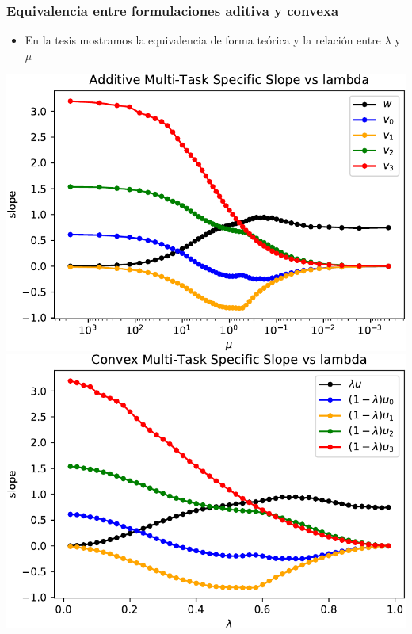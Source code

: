 \documentclass[aspectratio=43,spanish]{beamer}
\begin{document}
\begin{frame}
      \frametitle{Equivalencia entre formulaciones aditiva y convexa}

      \begin{itemize}
            \item En la tesis mostramos la equivalencia de forma teórica y la relación entre $\lambda$ y $\mu$
      \end{itemize}
      \vfill

    \includegraphics[width=.5\textwidth]{Chapter6/HAIS2019/synthetic_specWeights_add-crop.pdf}%
    \includegraphics[width=.5\textwidth]{Chapter6/HAIS2019/synthetic_specWeights_conv-crop.pdf}%


\end{frame}



\end{document}

